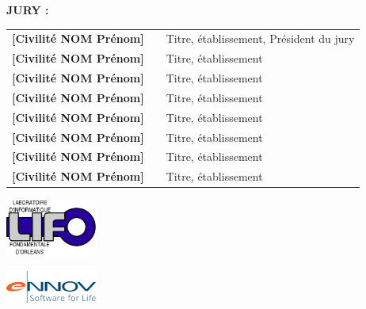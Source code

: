 {\begin{sffamily}
\textsc{\textbf{JURY : }}\vspace*{2mm}\\
\begin{tabular}{l p{2cm} p{8cm}}
\textbf{[Civilité NOM Prénom]} &  & Titre, établissement, Président du jury\\
\textbf{[Civilité NOM Prénom]} &  & Titre, établissement\\
\textbf{[Civilité NOM Prénom]} &  & Titre, établissement\\
\textbf{[Civilité NOM Prénom]} &  & Titre, établissement\\
\textbf{[Civilité NOM Prénom]} &  & Titre, établissement\\
\textbf{[Civilité NOM Prénom]} &  & Titre, établissement\\
\textbf{[Civilité NOM Prénom]} &  & Titre, établissement\\
\textbf{[Civilité NOM Prénom]} &  & Titre, établissement\\
\end{tabular}

\vspace{0.8cm}

\begin{minipage}{3cm}
\includegraphics[width=3cm]{logos/logoLIFO.png} 
\end{minipage}
\hfill
\begin{minipage}{3cm}
\includegraphics[width=3cm]{logos/logoEnnov.png} 
\end{minipage}
\hfill

\end{sffamily}
}
\setlength{\voffset}{0pt}